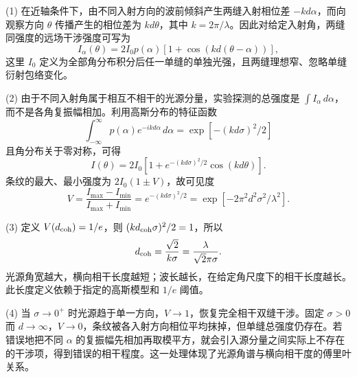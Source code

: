 (1) 在近轴条件下，由不同入射方向的波前倾斜产生两缝入射相位差 \(-kd\alpha\)，而向观察方向 \(\theta\) 传播产生的相位差为 \(kd\theta\)，其中 \(k=2\pi/\lambda\)。因此对给定入射角，两缝同强度的远场干涉强度可写为
\[
I_\alpha(\theta)=2I_0p(\alpha)[1+\cos(kd(\theta-\alpha))],
\]
这里 \(I_0\) 定义为全部角分布积分后任一单缝的单独光强，且两缝理想窄、忽略单缝衍射包络变化。

(2) 由于不同入射角属于相互不相干的光源分量，实验探测的总强度是 \(\int I_\alpha\,d\alpha\)，而不是各角复振幅相加。利用高斯分布的特征函数
\[
\int_{-\infty}^\infty p(\alpha)e^{-ikd\alpha}\,d\alpha
=\exp[-(kd\sigma)^2/2]
\]
且角分布关于零对称，可得
\[
I(\theta)=2I_0\left[1+
e^{-(kd\sigma)^2/2}\cos(kd\theta)\right].
\]
条纹的最大、最小强度为 \(2I_0(1\pm V)\)，故可见度
\[
V=\frac{I_{\max}-I_{\min}}{I_{\max}+I_{\min}}
=e^{-(kd\sigma)^2/2}
=\exp[-2\pi^2d^2\sigma^2/\lambda^2].
\]

(3) 定义 \(V(d_{\rm coh})=1/e\)，则 \((kd_{\rm coh}\sigma)^2/2=1\)，所以
\[
d_{\rm coh}=\frac{\sqrt2}{k\sigma}
=\frac{\lambda}{\sqrt2\pi\sigma}.
\]
光源角宽越大，横向相干长度越短；波长越长，在给定角尺度下的相干长度越长。此长度定义依赖于指定的高斯模型和 \(1/e\) 阈值。

(4) 当 \(\sigma\to0^+\) 时光源趋于单一方向，\(V\to1\)，恢复完全相干双缝干涉。固定 \(\sigma>0\) 而 \(d\to\infty\)，\(V\to0\)，条纹被各入射方向相位平均抹掉，但单缝总强度仍存在。若错误地把不同 \(\alpha\) 的复振幅先相加再取模平方，就会引入源分量之间实际上不存在的干涉项，得到错误的相干程度。这一处理体现了光源角谱与横向相干度的傅里叶关系。
